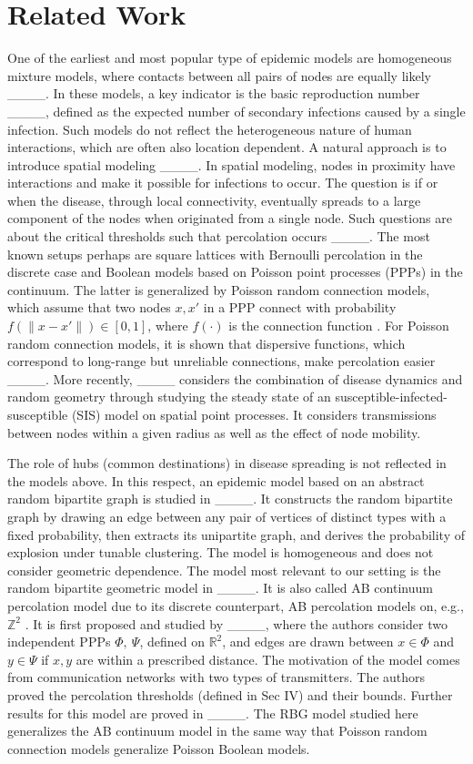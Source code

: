 \section{Related Work}
One of the earliest and most popular type of epidemic models are homogeneous mixture models, where contacts between all pairs of nodes are equally likely ____. In these models, a key indicator is the basic reproduction number ____, defined as the expected number of secondary infections caused by a single infection. Such models do not reflect the heterogeneous nature of human interactions, which are often also location dependent.
A natural approach is to introduce spatial modeling ____. In spatial modeling, nodes in proximity have interactions and make it possible for infections to occur. The question is if or when the disease, through local connectivity, eventually spreads to a large component of the nodes when originated from a single node. Such questions are about the critical thresholds such that percolation occurs ____.
The most known setups perhaps are square lattices with Bernoulli percolation in the discrete case and Boolean models based on Poisson point processes (PPPs) in the continuum. 
The latter is generalized by Poisson random connection models, which assume that two nodes $x,x'$ in a PPP connect with probability $f(\|x-x'\|)\in[0,1]$, where $f(\cdot)$ is the connection function \cite[Chapter 6]{MeesterRonald1996CP}. {For Poisson random connection models, it is shown that dispersive functions, which correspond to long-range but  unreliable connections, make 
percolation easier }____.
More recently, ____ considers the combination of disease dynamics and random geometry through studying the steady state of an susceptible-infected-susceptible (SIS) model on spatial point processes. It considers transmissions between nodes within a given radius as well as the effect of node mobility.
 
 

 
 The role of hubs (common destinations) in disease spreading is not reflected in the models above. In this respect, an epidemic model based on an abstract random bipartite graph is studied in ____. It constructs the random bipartite graph by drawing an edge between any pair of vertices of distinct types with a fixed probability, then extracts its unipartite graph, and derives the probability of explosion under tunable clustering. The model is homogeneous and does not consider geometric dependence. The model most relevant to our setting is the random bipartite geometric model in ____. It is also called AB continuum percolation model due to its discrete counterpart, AB percolation models on, e.g., $\mathbb{Z}^2$ \cite[Chapter 12]{grimmett1999percolation}. It is first proposed and studied by ____, where the authors consider two independent PPPs $\Phi,~\Psi$, defined on $\mathbb{R}^2$, and edges are drawn between $x\in\Phi$ and $y\in \Psi$ if $x,y$ are within a prescribed distance. The motivation of the model comes from communication networks with two types of transmitters. The authors proved the percolation thresholds (defined in Sec IV) and their bounds. Further results for this model are proved in ____. The RBG model studied here generalizes the AB continuum model in the same way that Poisson random connection models generalize Poisson Boolean models.